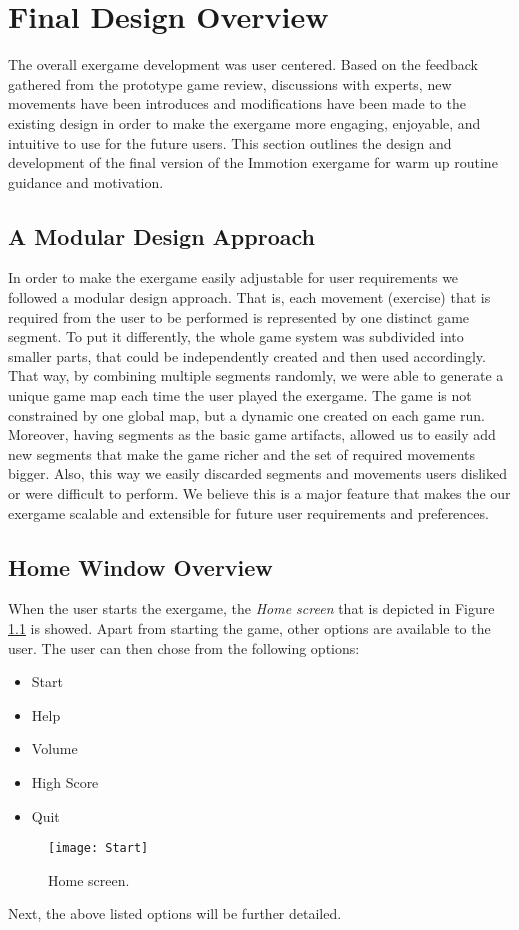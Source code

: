 \chapter{Final Design Overview}\label{chapter:finaldesign}
The overall exergame development was user centered. Based on the feedback gathered from the prototype game review, discussions with experts, new movements have been introduces and modifications have been made to the existing design in order to make the exergame more engaging, enjoyable, and intuitive to use for the future users. This section outlines the design and development of the final version of the Immotion exergame for warm up routine guidance and motivation.
\section{A Modular Design Approach}
In order to make the exergame easily adjustable for user requirements we followed a modular design approach. That is, each movement (exercise) that is required from the user to be performed is represented by one distinct game segment. To put it differently, the whole game system was subdivided into smaller parts, that could be independently created and then used accordingly. That way, by combining multiple segments randomly, we were able to generate a unique game map each time the user played the exergame. The game is not constrained by one global map, but a dynamic one created on each game run. Moreover, having segments as the basic game artifacts, allowed us to easily add new segments that make the game richer and the set of required movements bigger. Also, this way we easily discarded segments and movements users disliked or were difficult to perform. We believe this is a major feature that makes the our exergame scalable and extensible for future user requirements and preferences. 
\section{Home Window Overview}
When the user starts the exergame, the \textit{Home screen} that is depicted in Figure \ref{fig:start} is showed. Apart from starting the game, other options are available to the user. The user can then chose from the following options:
\begin{itemize}
\item Start
\item Help
\item Volume
\item High Score
\item Quit
\end{itemize}
\begin{figure}[h]
    \centering
    \texttt{[image: Start]}
    \caption{Home screen.}
    \label{fig:start}
\end{figure}
Next, the above listed options will be further detailed.\pagebreak
